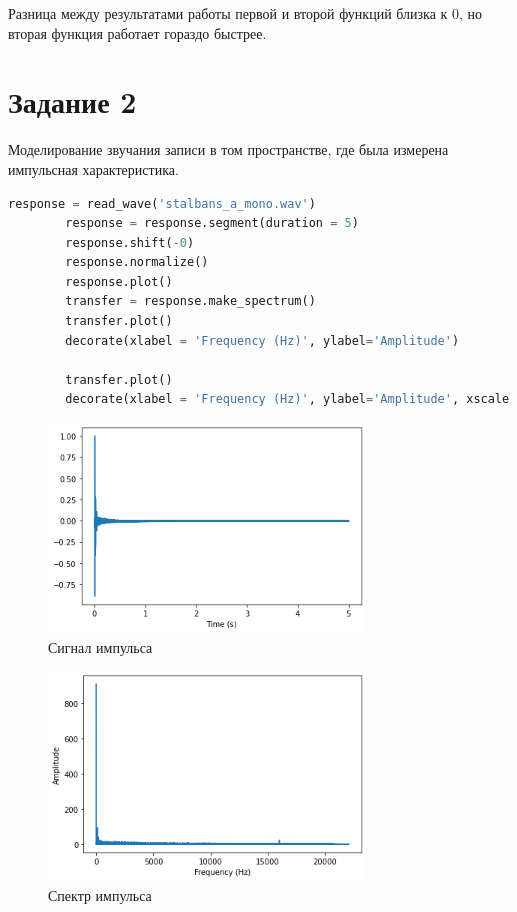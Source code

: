 \documentclass[a4paper, 12pt]{report}
\begin{document}
	Разница между результатами работы первой и второй функций близка к 0, но вторая функция работает гораздо быстрее.

	\section{Задание 2}
	Моделирование звучания записи в том пространстве, где была измерена импульсная характеристика.
	\begin{lstlisting}[language=Python,caption=Сначала попробуем какой-то звук]
		response = read_wave('stalbans_a_mono.wav')
		response = response.segment(duration = 5)
		response.shift(-0)
		response.normalize()
		response.plot()
		transfer = response.make_spectrum()
		transfer.plot()
		decorate(xlabel = 'Frequency (Hz)', ylabel='Amplitude')

		transfer.plot()
		decorate(xlabel = 'Frequency (Hz)', ylabel='Amplitude', xscale = 'log', yscale = 'log')
	\end{lstlisting}
	\begin{figure}[H]
		\centering
		\includegraphics[width=0.75\textwidth]{task9.png}
		\caption{Сигнал импульса}
		\label{fig:task9}
	\end{figure}
	\begin{figure}[H]
		\centering
		\includegraphics[width=0.75\textwidth]{task10.png}
		\caption{Спектр импульса}
		\label{fig:task10}
	\end{figure}
\end{document}
